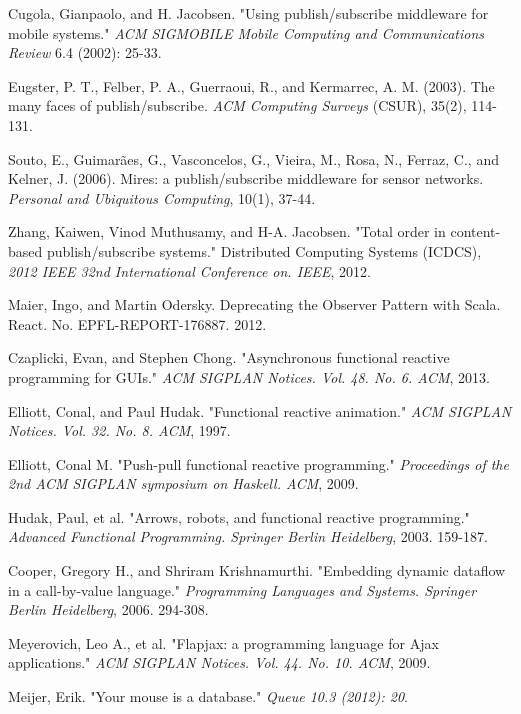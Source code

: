 \documentclass{sigplanconf}
\begin{document}
\begin{thebibliography}{}
 Cugola, Gianpaolo, and H. Jacobsen. "Using publish/subscribe middleware for mobile systems." {\em ACM SIGMOBILE Mobile Computing and Communications Review } 6.4 (2002): 25-33.

 Eugster, P. T., Felber, P. A., Guerraoui, R., and Kermarrec, A. M. (2003). The many faces of publish/subscribe. {\em ACM Computing Surveys} (CSUR), 35(2), 114-131.

 Souto, E., Guimarães, G., Vasconcelos, G., Vieira, M., Rosa, N., Ferraz, C., and Kelner, J. (2006). Mires: a publish/subscribe middleware for sensor networks. {\em Personal and Ubiquitous Computing}, 10(1), 37-44.

Zhang, Kaiwen, Vinod Muthusamy, and H-A. Jacobsen. "Total order in content-based publish/subscribe systems." Distributed Computing Systems (ICDCS), {\em 2012 IEEE 32nd International Conference on. IEEE}, 2012.

 Maier, Ingo, and Martin Odersky. Deprecating the Observer Pattern with Scala. React. No. EPFL-REPORT-176887. 2012.

 Czaplicki, Evan, and Stephen Chong. "Asynchronous functional reactive programming for GUIs." {\em ACM SIGPLAN Notices. Vol. 48. No. 6. ACM}, 2013.

Elliott, Conal, and Paul Hudak. "Functional reactive animation." {\em ACM SIGPLAN Notices. Vol. 32. No. 8. ACM}, 1997.

Elliott, Conal M. "Push-pull functional reactive programming." {\em Proceedings of the 2nd ACM SIGPLAN symposium on Haskell. ACM}, 2009.

Hudak, Paul, et al. "Arrows, robots, and functional reactive programming."  {\em Advanced Functional Programming. Springer Berlin Heidelberg}, 2003. 159-187.

Cooper, Gregory H., and Shriram Krishnamurthi. "Embedding dynamic dataflow in a call-by-value language." {\em Programming Languages and Systems. Springer Berlin Heidelberg}, 2006. 294-308.

 Meyerovich, Leo A., et al. "Flapjax: a programming language for Ajax applications." {\em ACM SIGPLAN Notices. Vol. 44. No. 10. ACM}, 2009.

Meijer, Erik. "Your mouse is a database." {\em Queue 10.3 (2012): 20}.



\end{thebibliography}
\end{document}
